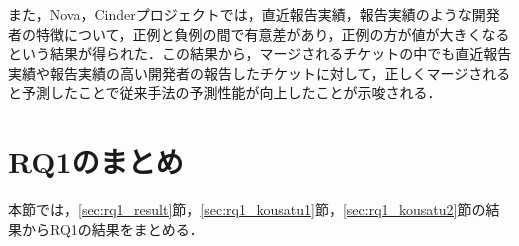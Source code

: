 \documentclass[submit]{ipsj}
\begin{document}
また，Nova，Cinderプロジェクトでは，直近報告実績，報告実績のような開発者の特徴について，正例と負例の間で有意差があり，正例の方が値が大きくなるという結果が得られた．この結果から，マージされるチケットの中でも直近報告実績や報告実績の高い開発者の報告したチケットに対して，正しくマージされると予測したことで従来手法の予測性能が向上したことが示唆される．


\begin{table}[t]
\caption{マージ予測モデルにおいて重要度の高い説明変数の正例と負例の有意差および違い}
\label{table:merge_importance_yuisa}
\centering
\vspace{0.5zh}
\end{table}


\section{RQ1のまとめ}\label{sec:rq1_matome}
本節では，\ref{sec:rq1_result}節，\ref{sec:rq1_kousatu1}節，\ref{sec:rq1_kousatu2}節の結果からRQ1の結果をまとめる．
\end{document}
